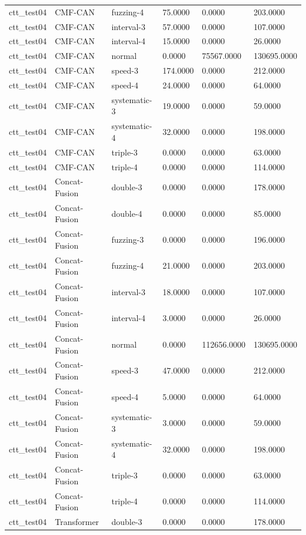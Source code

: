 \begin{tabular}{llllll}
ctt_test04 & CMF-CAN & fuzzing-4 & 75.0000 & 0.0000 & 203.0000 \\
ctt_test04 & CMF-CAN & interval-3 & 57.0000 & 0.0000 & 107.0000 \\
ctt_test04 & CMF-CAN & interval-4 & 15.0000 & 0.0000 & 26.0000 \\
ctt_test04 & CMF-CAN & normal & 0.0000 & 75567.0000 & 130695.0000 \\
ctt_test04 & CMF-CAN & speed-3 & 174.0000 & 0.0000 & 212.0000 \\
ctt_test04 & CMF-CAN & speed-4 & 24.0000 & 0.0000 & 64.0000 \\
ctt_test04 & CMF-CAN & systematic-3 & 19.0000 & 0.0000 & 59.0000 \\
ctt_test04 & CMF-CAN & systematic-4 & 32.0000 & 0.0000 & 198.0000 \\
ctt_test04 & CMF-CAN & triple-3 & 0.0000 & 0.0000 & 63.0000 \\
ctt_test04 & CMF-CAN & triple-4 & 0.0000 & 0.0000 & 114.0000 \\
ctt_test04 & Concat-Fusion & double-3 & 0.0000 & 0.0000 & 178.0000 \\
ctt_test04 & Concat-Fusion & double-4 & 0.0000 & 0.0000 & 85.0000 \\
ctt_test04 & Concat-Fusion & fuzzing-3 & 0.0000 & 0.0000 & 196.0000 \\
ctt_test04 & Concat-Fusion & fuzzing-4 & 21.0000 & 0.0000 & 203.0000 \\
ctt_test04 & Concat-Fusion & interval-3 & 18.0000 & 0.0000 & 107.0000 \\
ctt_test04 & Concat-Fusion & interval-4 & 3.0000 & 0.0000 & 26.0000 \\
ctt_test04 & Concat-Fusion & normal & 0.0000 & 112656.0000 & 130695.0000 \\
ctt_test04 & Concat-Fusion & speed-3 & 47.0000 & 0.0000 & 212.0000 \\
ctt_test04 & Concat-Fusion & speed-4 & 5.0000 & 0.0000 & 64.0000 \\
ctt_test04 & Concat-Fusion & systematic-3 & 3.0000 & 0.0000 & 59.0000 \\
ctt_test04 & Concat-Fusion & systematic-4 & 32.0000 & 0.0000 & 198.0000 \\
ctt_test04 & Concat-Fusion & triple-3 & 0.0000 & 0.0000 & 63.0000 \\
ctt_test04 & Concat-Fusion & triple-4 & 0.0000 & 0.0000 & 114.0000 \\
ctt_test04 & Transformer & double-3 & 0.0000 & 0.0000 & 178.0000 \\

\end{tabular}
